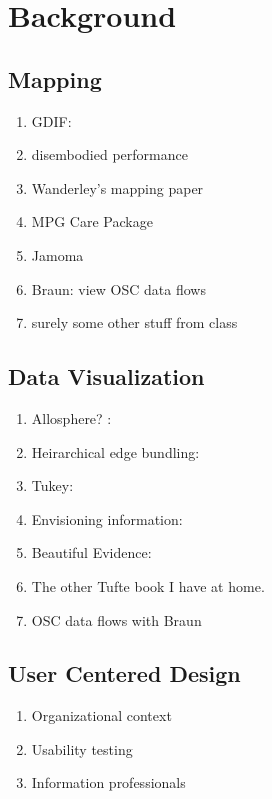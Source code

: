 \chapter{Background}

\section{Mapping}
	\begin{enumerate}
		\item GDIF: 
		\item disembodied performance
		\item Wanderley's mapping paper 
		\item MPG Care Package 
		\item Jamoma 
		\item Braun: view OSC data flows 
		\item surely some other stuff from class
	\end{enumerate}

\section{Data Visualization}
	\begin{enumerate}
		\item Allosphere? :
		\item Heirarchical edge bundling: 
		\item Tukey: 
		\item Envisioning information: 
		\item Beautiful Evidence: 
		\item The other Tufte book I have at home.
		\item OSC data flows with Braun 
	\end{enumerate}

\section{User Centered Design}
	\begin{enumerate}
		\item Organizational context 
		\item Usability testing 
		\item Information professionals 
	\end{enumerate}

